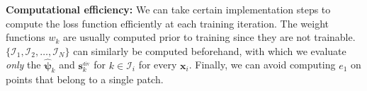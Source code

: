 \documentclass[12pt]{exam}
\def\bx{\mathbf{x}}
\def\bs{\mathbf{s}}
\def\nn{\hat{\boldsymbol{\psi}}}
\def\I{\mathcal{I}}
\begin{document}
\begin{questions}
{\bf Computational efficiency:} We can take certain implementation steps to compute the loss function efficiently at each training iteration. The weight functions $w_k$ are usually computed prior to training since they are not trainable. $\{\I_1, \I_2, \dots, \I_N\}$ can similarly be computed beforehand, with which we evaluate \emph{only} the $\nn_k$ and $\bs_{k}^{_{\text{div}}}$ for $k \in \I_i$ for every $\bx_i$. Finally, we can avoid computing $e_1$ on points that belong to a single patch.
%
\pagebreak

\end{questions}



\end{document}
